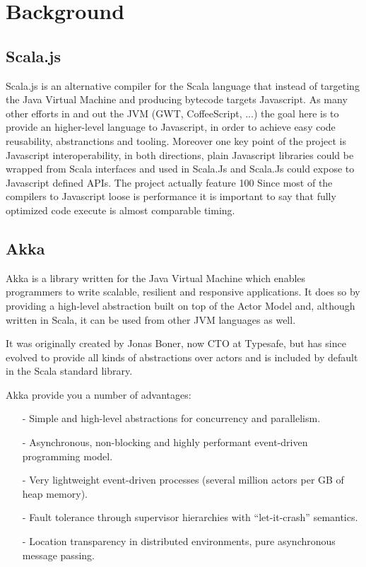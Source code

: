 \documentclass{sig-alternate}
\begin{document}
\section{Background}

\subsection{Scala.js}

Scala.js is an alternative compiler for the Scala language that instead of targeting the Java Virtual Machine and producing bytecode targets Javascript.
As many other efforts in and out the JVM (GWT, CoffeeScript, ...) the goal here is to provide an higher-level language to Javascript, in order to achieve easy code reusability, abstranctions and tooling.
Moreover one key point of the project is Javascript interoperability, in both directions, plain Javascript libraries could be wrapped from Scala interfaces and used in Scala.Js and Scala.Js could expose to Javascript defined APIs.
The project actually feature 100%
Since most of the compilers to Javascript loose is performance it is important to say that fully optimized code execute is almost comparable timing.

\subsection{Akka}\label{sec:akka}

Akka is a library written for the Java Virtual Machine which enables programmers to write
scalable, resilient and responsive applications. It does so by providing a high-level
abstraction built on top of the Actor Model and, although written in Scala, it can be used
from other JVM languages as well.

It was originally created by Jonas Boner, now CTO at Typesafe, but has since evolved to
provide all kinds of abstractions over actors and is included by default in the Scala 
standard library.

Akka provide you a number of advantages:
\begin{itemize}
	\item[-] Simple and high-level abstractions for concurrency and parallelism.
	\item[-] Asynchronous, non-blocking and highly performant event-driven programming model.
	\item[-] Very lightweight event-driven processes (several million actors per GB of heap memory).
	\item[-] Fault tolerance through supervisor hierarchies with ``let-it-crash'' semantics.
	\item[-] Location transparency in distributed environments, pure asynchronous message passing. 
\end{itemize}
\end{document}
